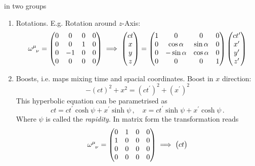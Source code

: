 in two groups
\begin{enumerate}
  \item Rotations. E.g. Rotation around $z$-Axis:
  \begin{align*}
  \tensor{\omega}{^\mu_\nu}
  =\begin{pmatrix}
  0&0 & 0&0\\
  0&0 &1&0\\
  0&-1&0 &0\\
  0&0 &0 &0
  \end{pmatrix}\implies
  \begin{pmatrix}
  ct\\
  x\\
  y\\
  z\\
  \end{pmatrix}=
  \begin{pmatrix}
  1&0 & 0&0\\
  0&\cos\alpha &\sin\alpha&0\\
  0&-\sin\alpha&\cos\alpha &0\\
  0&0 &0 &1
  \end{pmatrix}
  \begin{pmatrix}
  ct^\prime\\
  x^\prime\\
  y^\prime\\
  z^\prime
  \end{pmatrix}
  \end{align*}
  \item Boosts, i.e. maps mixing time and spacial coordinates. Boost in $x$
  direction:
  \begin{equation}
  -(ct)^2+x^2=(ct^\prime)^2+(x^\prime)^2
  \end{equation}
  This hyperbolic equation can be parametrised as
  \begin{equation}
  ct = ct^\prime\cosh\psi+x^\prime\sinh\psi\,, \quad x =
  ct^\prime\sinh\psi+x^\prime\cosh\psi\, .
  \end{equation}
  Where $\psi$ is called the \emph{rapidity}. In matrix form the transformation
  reads
  \begin{align*}
  \tensor{\omega}{^\mu_\nu}
  =\begin{pmatrix}
  0&1 & 0&0\\
  1&0 &0&0\\
  0&0&0 &0\\
  0&0 &0 &0
  \end{pmatrix}\implies
  \begin{pmatrix}
  ct\\

\end{pmatrix}
\end{align*}
\end{enumerate}
